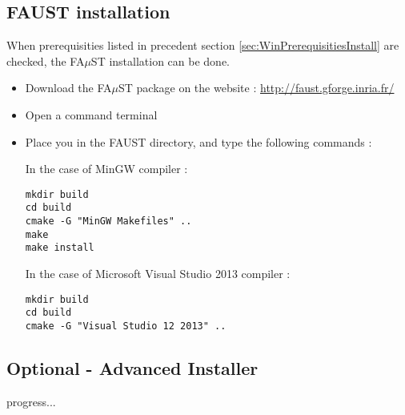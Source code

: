 \subsection{FAUST installation}\label{sec:WinFaustInstall}
When prerequisities listed in precedent section \ref{sec:WinPrerequisitiesInstall} are checked, the FA$\mu$ST installation can be done. 
\begin{itemize}
\item Download the FA$\mu$ST package on the website :  \url{http://faust.gforge.inria.fr/}
\item Open a command terminal
\item Place you in the FAUST directory, and type the following commands : 

In the case of MinGW compiler :
\begin{lstlisting}
mkdir build
cd build
cmake -G "MinGW Makefiles" .. 
make
make install
\end{lstlisting}

In the case of Microsoft Visual Studio 2013 compiler :
\begin{lstlisting}
mkdir build
cd build
cmake -G "Visual Studio 12 2013" .. 
\end{lstlisting}

\end{itemize}


\subsection{Optional - Advanced Installer}\label{sec:WinOptionalInstall}

progress... 




